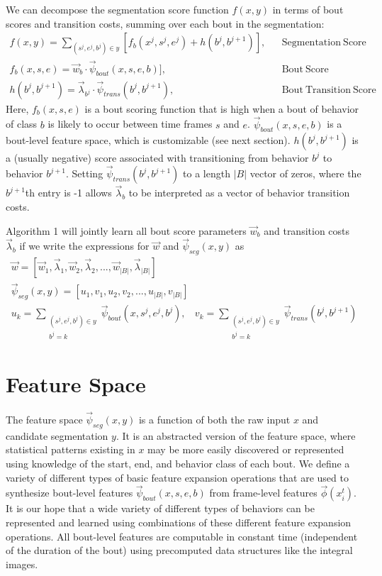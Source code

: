 \documentclass[10pt, onecolumn]{article}
\newcommand{\1}{\textbf{1}}
\begin{document}
We can decompose the segmentation score function $f(x,y)$ in terms of bout scores and transition costs, summing over each bout in the segmentation:
\begin{eqnarray}
 f(x,y) = \sum_{(s^j,e^j,b^j) \in y} \left[f_{b}(x^j,s^j,e^j) + h(b^j,b^{j+1}) \right], &&\mathrm{Segmentation\ Score}\\
\label{eq:score_decomposition}
 f_{b}(x,s,e) = \vec{w}_b \cdot \vec{\psi}_{bout}(x,s,e,b)], &&\mathrm{Bout\ Score}\\
 h(b^j,b^{j+1}) = \vec{\lambda}_{b^j} \cdot \vec{\psi}_{trans}(b^j,b^{j+1}), &&\mathrm{Bout\ Transition\ Score}
\end{eqnarray}
Here, $f_{b}(x,s,e)$ is a bout scoring function that is high when a bout of behavior of class $b$ is likely to occur between time frames $s$ and $e$.  $\vec{\psi}_{bout}(x,s,e,b)$ is a bout-level feature space, which is customizable (see next section).  $h(b^j,b^{j+1})$ is a (usually negative) score associated with transitioning from behavior $b^j$ to behavior $b^{j+1}$.  Setting $\vec{\psi}_{trans}(b^j,b^{j+1})$ to a length $|B|$ vector of zeros, where the $b^{j+1}$th entry is -1 allows $\vec{\lambda}_b$ to be interpreted as a vector of behavior transition costs.

Algorithm 1 will jointly learn all bout score parameters $\vec{w}_b$ and transition costs $\vec{\lambda}_b$ if we write the expressions for $\vec{w}$ and $\vec{\psi}_{seg}(x,y)$ as
\begin{eqnarray}
\vec{w} = [\vec{w}_1,\vec{\lambda}_1,\vec{w}_2,\vec{\lambda}_2,...,\vec{w}_{|B|},\vec{\lambda}_{|B|}]\\
\vec{\psi}_{seg}(x,y) = [u_1,v_1,u_2,v_2,...,u_{|B|},v_{|B|}]\\
u_k=\sum_{\substack{(s^j,e^j,b^j)\in y\\b^j=k}} \vec{\psi}_{bout}(x,s^j,e^j,b^j),\ \ \ \ v_k=\sum_{\substack{(s^j,e^j,b^j)\in y\\b^j=k}}\vec{\psi}_{trans}(b^j,b^{j+1})
\end{eqnarray}

\section{Feature Space}
The feature space $\vec{\psi}_{seg}(x,y)$ is a function of both the raw input $x$ and candidate segmentation $y$.  It is an abstracted version of the feature space, where statistical patterns existing in $x$ may be more easily discovered or represented using knowledge of the start, end, and behavior class of each bout.  We define a variety of different types of basic feature expansion operations that are used to synthesize bout-level features $\vec{\psi}_{bout}(x,s,e,b)$ from frame-level features $\vec{\phi}(x_i^t)$.  It is our hope that a wide variety of different types of behaviors can be represented and learned using combinations of these different feature expansion operations.  All bout-level features are computable in constant time (independent of the duration of the bout) using precomputed data structures like the integral images.
\end{document}
